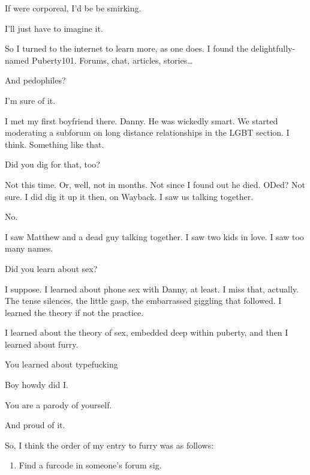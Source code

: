 \begin{leftcolumn}
\begin{ally}
If were corporeal, I'd be be smirking.
\end{ally}
I'll just have to imagine it.

So I turned to the internet to learn more, as one does. I found the delightfully-named Puberty101. Forums, chat, articles, stories\ldots{}

\begin{ally}
And pedophiles?
\end{ally}
I'm sure of it.

I met my first boyfriend there. Danny. He was wickedly smart. We started moderating a subforum on long distance relationships in the LGBT section. I think. Something like that.

\begin{ally}
Did you dig for that, too?
\end{ally}
Not this time. Or, well, not in months. Not since I found out he died. ODed? Not sure. I did dig it up it then, on Wayback. I saw us talking together.

No.

I saw Matthew and a dead guy talking together. I saw two kids in love. I saw too many names.

\begin{ally}
Did you learn about sex?
\end{ally}
I suppose. I learned about phone sex with Danny, at least. I miss that, actually. The tense silences, the little gasp, the embarrassed giggling that followed. I learned the theory if not the practice.

I learned about the theory of sex, embedded deep within puberty, and then I learned about furry.

\begin{ally}
You learned about typefucking
\end{ally}
Boy howdy did I.

\begin{ally}
You are a parody of yourself.
\end{ally}
And proud of it.
\newpage

\noindent So, I think the order of my entry to furry was as follows:

\begin{enumerate}
\def\labelenumi{\arabic{enumi}.}
\item
  Find a furcode in someone's forum sig.


\end{enumerate}
\end{leftcolumn}
